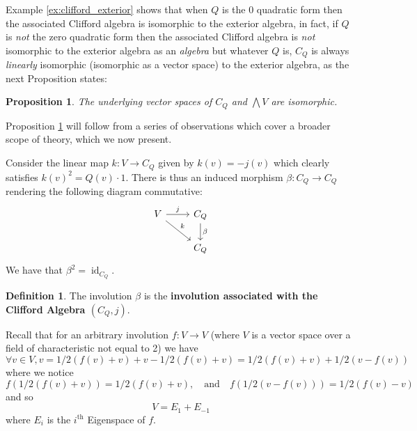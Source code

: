 \documentclass[12pt]{article}
\theoremstyle{plain}
\newtheorem{proposition}[thm]{Proposition}
\theoremstyle{definition}
\newtheorem{defn}[thm]{Definition} %
\newcommand{\lto}{\longrightarrow}
\begin{document}
Example \ref{ex:clifford_exterior} shows that when $Q$ is the 0 quadratic form then the associated Clifford algebra is isomorphic to the exterior algebra, in fact, if $Q$ is \emph{not} the zero quadratic form then the associated Clifford algebra is \emph{not} isomorphic to the exterior algebra as an \emph{algebra} but whatever $Q$ is, $C_Q$ is always \emph{linearly} isomorphic (isomorphic as a vector space) to the exterior algebra, as the next Proposition states:
\begin{proposition}\label{prop:linear_iso}
	The underlying vector spaces of $C_Q$ and $\bigwedge V$ are isomorphic.
\end{proposition}
Proposition \ref{prop:linear_iso} will follow from a series of observations which cover a broader scope of theory, which we now present.

Consider the linear map $k: V \lto C_Q$ given by $k(v) = -j(v)$ which clearly satisfies $k(v)^2 = Q(v)\cdot 1$. There is thus an induced morphism $\beta: C_Q \lto C_Q$ rendering the following diagram commutative:
\begin{equation}
	\begin{tikzcd}
		V\arrow[r,"j"]\arrow[dr,"k"] & C_Q\arrow[d,"\beta"]\\
		& C_Q
	\end{tikzcd}
\end{equation}
We have that $\beta^2 = \operatorname{id}_{C_Q}$. 

\begin{defn}
	The involution $\beta$ is the \textbf{involution associated with the Clifford Algebra $(C_Q,j)$}.
\end{defn}
Recall that for an arbitrary involution $f: V \lto V$ (where $V$ is a vector space over a field of characteristic not equal to 2) we have
\begin{equation}
	\forall v \in V, v = 1/2(f(v) + v) + v - 1/2(f(v) + v) = 1/2(f(v) + v) + 1/2(v - f(v))
\end{equation}
where we notice
\begin{equation}
	f(1/2(f(v) + v)) = 1/2(f(v) + v),\quad \text{and}\quad f(1/2(v - f(v))) = 1/2(f(v) - v)
\end{equation}
and so
\begin{equation}
	V = E_1 + E_{-1}
\end{equation}
where $E_i$ is the $i^\text{th}$ Eigenspace of $f$. 
\end{document}
